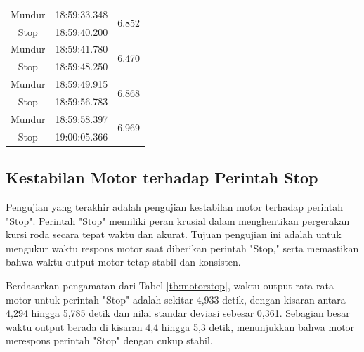 \begin{longtable}{|c|c|c|}
  Mundur & 18:59:33.348 & \multirow{2}{*}{6.852} \\ \cline{1-2}
  Stop   & 18:59:40.200 &                        \\ \hline
  Mundur & 18:59:41.780 & \multirow{2}{*}{6.470} \\ \cline{1-2}
  Stop   & 18:59:48.250 &                        \\ \hline
  Mundur & 18:59:49.915 & \multirow{2}{*}{6.868} \\ \cline{1-2}
  Stop   & 18:59:56.783 &                        \\ \hline
  Mundur & 18:59:58.397 & \multirow{2}{*}{6.969} \\ \cline{1-2}
  Stop   & 19:00:05.366 &                        \\ \hline
\end{longtable}

\subsection{Kestabilan Motor terhadap Perintah Stop}

Pengujian yang terakhir adalah pengujian kestabilan motor terhadap perintah "Stop". Perintah "Stop" memiliki peran krusial dalam menghentikan pergerakan kursi roda secara tepat waktu dan akurat. Tujuan pengujian ini adalah untuk mengukur waktu respons motor saat diberikan perintah "Stop," serta memastikan bahwa waktu output motor tetap stabil dan konsisten.

Berdasarkan pengamatan dari Tabel \ref{tb:motorstop}, waktu output rata-rata motor untuk perintah "Stop" adalah sekitar 4,933 detik, dengan kisaran antara 4,294 hingga 5,785 detik dan nilai standar deviasi sebesar 0,361. Sebagian besar waktu output berada di kisaran 4,4 hingga 5,3 detik, menunjukkan bahwa motor merespons perintah "Stop" dengan cukup stabil.

